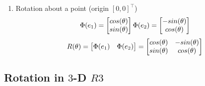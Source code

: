 \begin{enumerate}
    \item Rotation about a point (origin $[0, 0]^\top$)
    \[
        \hfill
        \Phi(e_1) =
        \begin{bmatrix}
            cos(\theta) \\ 
            sin(\theta)
        \end{bmatrix}
        \hfill
        \Phi(e_2) =
        \begin{bmatrix}
            -sin(\theta)\\
            cos(\theta)  
        \end{bmatrix}
        \hfill
    \]
    \[
        \hfill
        R(\theta) = 
        \begin{bmatrix}
            \Phi(e_1) & \Phi(e_2)
        \end{bmatrix} =
        \begin{bmatrix}
            cos(\theta) & -sin(\theta)\\ 
            sin(\theta) & cos(\theta)
        \end{bmatrix}
        \hfill
    \]
\end{enumerate}


\subsection{Rotation in $3$-D $R3$ \cite{mfml-1}} \label{Rotation in 3-D}

